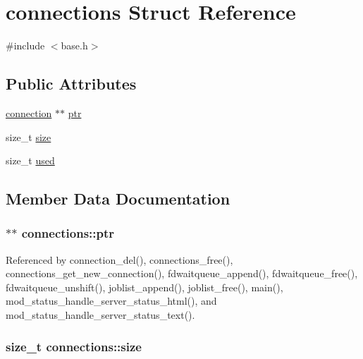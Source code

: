 \hypertarget{structconnections}{\section{connections Struct Reference}
\label{structconnections}
}


{\ttfamily \#include $<$base.\-h$>$}

\subsection*{Public Attributes}
\begin{DoxyCompactItemize}
\item 
\hyperlink{structconnection}{connection} $\ast$$\ast$ \hyperlink{structconnections_afb26686a022726d235793f09cb5ab7cc}{ptr}
\item 
size\-\_\-t \hyperlink{structconnections_a68f429b41b33a0d282f7a04d834e0fe3}{size}
\item 
size\-\_\-t \hyperlink{structconnections_ab810ad1745091a72c889255e894b7037}{used}
\end{DoxyCompactItemize}


\subsection{Member Data Documentation}
\hypertarget{structconnections_afb26686a022726d235793f09cb5ab7cc}{
\subsubsection[{ptr}]{$\ast$$\ast$ connections\-::ptr}}\label{structconnections_afb26686a022726d235793f09cb5ab7cc}


Referenced by connection\-\_\-del(), connections\-\_\-free(), connections\-\_\-get\-\_\-new\-\_\-connection(), fdwaitqueue\-\_\-append(), fdwaitqueue\-\_\-free(), fdwaitqueue\-\_\-unshift(), joblist\-\_\-append(), joblist\-\_\-free(), main(), mod\-\_\-status\-\_\-handle\-\_\-server\-\_\-status\-\_\-html(), and mod\-\_\-status\-\_\-handle\-\_\-server\-\_\-status\-\_\-text().

\hypertarget{structconnections_a68f429b41b33a0d282f7a04d834e0fe3}{
\subsubsection[{size}]{\setlength{\rightskip}{0pt plus 5cm}size\-\_\-t connections\-::size}}\label{structconnections_a68f429b41b33a0d282f7a04d834e0fe3}


